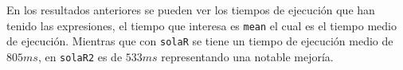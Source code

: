 En los resultados anteriores se pueden ver los tiempos de ejecución que han tenido las expresiones, el tiempo que interesa es \texttt{mean} el cual es el tiempo medio de ejecución. Mientras que con \texttt{solaR} se tiene un tiempo de ejecución medio de \(805 ms\), en \texttt{solaR2} es de \(533 ms\) representando una notable mejoría.
